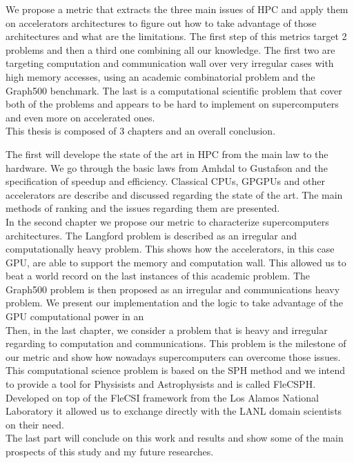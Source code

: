 We propose a metric that extracts the three main issues of HPC and apply them on accelerators architectures to figure out how to take advantage of those architectures and what are the limitations. 
The first step of this metrics target 2 problems and then a third one combining all our knowledge.
The first two are targeting computation and communication wall over very irregular cases with high memory accesses, using an academic combinatorial problem and the Graph500 benchmark. 
The last is a computational scientific problem that cover both of the problems and appears to be hard to implement on supercomputers and even more on accelerated ones.\\

This thesis is composed of 3 chapters and an overall conclusion. 

The first will develope the state of the art in HPC from the main law to the hardware. 	
We go through the basic laws from Amhdal to Gustafson and the specification of speedup and efficiency.
Classical CPUs, GPGPUs and other accelerators are describe and discussed regarding the state of the art. 
The main methods of ranking and the issues regarding them are presented.\\ 

In the second chapter we propose our metric to characterize supercomputers architectures. 
The Langford problem is described as an irregular and computationally heavy problem.
This shows how the accelerators, in this case GPU, are able to support the memory and computation wall. 
This allowed us to beat a world record on the last instances of this academic problem.
The Graph500 problem is then proposed as an irregular and communications heavy problem. 
We present our implementation and the logic to take advantage of the GPU computational power in an \\

Then, in the last chapter, we consider a problem that is heavy and irregular regarding to computation and communications.
This problem is the milestone of our metric and show how nowadays supercomputers can overcome those issues. 
This computational science problem is based on the SPH method and we intend to provide a tool for Physisists and Astrophysists and is called FleCSPH. 
Developed on top of the FleCSI framework from the Los Alamos National Laboratory it allowed us to exchange directly with the LANL domain scientists on their need.\\

The last part will conclude on this work and results and show some of the main prospects of this study and my future researches. 